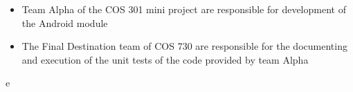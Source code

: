 \begin{itemize}
	\item Team Alpha of the COS 301 mini project are responsible for development of the Android module
	\item The Final Destination team of COS 730 are responsible for the documenting and execution of the unit tests of the code provided by team Alpha
\end{itemize}e